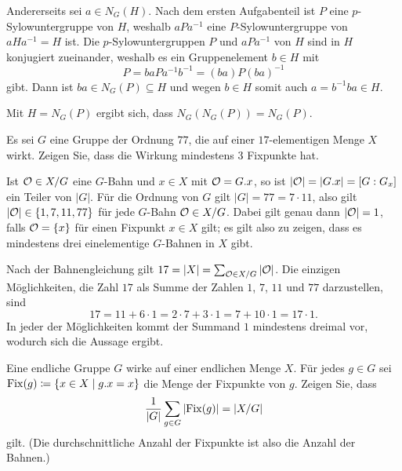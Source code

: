 \begin{solution}
\begin{enumerate}
      Andererseits sei $a \in N_G(H)$.
      Nach dem ersten Aufgabenteil ist $P$ eine $p$-Sylow\-un\-ter\-gruppe von $H$, weshalb $aPa^{-1}$ eine $P$-Sylow\-unter\-gruppe von $aHa^{-1} = H$ ist.
      Die $p$-Sylow\-unter\-gruppen $P$ und $aPa^{-1}$ von $H$ sind in $H$ konjugiert zueinander, weshalb es ein Gruppenelement $b \in H$ mit
      \[
          P
        = baPa^{-1}b^{-1}
        = (ba)P(ba)^{-1}
      \]
      gibt.
      Dann ist $ba \in N_G(P) \subseteq H$ und wegen $b \in H$ somit auch $a = b^{-1} ba \in H$.
      
      Mit $H = N_G(P)$ ergibt sich, dass $N_G(N_G(P)) = N_G(P)$.
  \end{enumerate}
\end{solution}


\begin{question}[subtitle = Bahnenkombinatorik]
  Es sei $G$ eine Gruppe der Ordnung $77$, die auf einer $17$-elementigen Menge $X$ wirkt.
  Zeigen Sie, dass die Wirkung mindestens $3$ Fixpunkte hat.
\end{question}


\begin{solution}
  Ist $\mathcal{O} \in X/G$ eine $G$-Bahn und $x \in X$ mit $\mathcal{O} = G.x$, so ist $|\mathcal{O}| = |G.x| = [G : G_x]$ ein Teiler von $|G|$.
  Für die Ordnung von $G$ gilt $|G| = 77 = 7 \cdot 11$, also gilt $|\mathcal{O}| \in \{1, 7, 11, 77\}$ für jede $G$-Bahn $\mathcal{O} \in X/G$.
  Dabei gilt genau dann $|\mathcal{O}| = 1$, falls $\mathcal{O} = \{x\}$ für einen Fixpunkt $x \in X$ gilt;
  es gilt also zu zeigen, dass es mindestens drei einelementige $G$-Bahnen in $X$ gibt.
  
  Nach der Bahnengleichung gilt $17 = |X| = \sum_{\mathcal{O} \in X/G} |\mathcal{O}|$.
  Die einzigen Möglichkeiten, die Zahl $17$ als Summe der Zahlen $1$, $7$, $11$ und $77$ darzustellen, sind
  \[
      17
    = 11 + 6 \cdot 1
    = 2 \cdot 7 + 3 \cdot 1
    = 7 + 10 \cdot 1
    = 17 \cdot 1.
  \]
  In jeder der Möglichkeiten kommt der Summand $1$ mindestens dreimal vor, wodurch sich die Aussage ergibt.
\end{solution}


\begin{question}[subtitle = Bahnen zählen]
  Eine endliche Gruppe $G$ wirke auf einer endlichen Menge $X$.
  Für jedes $g \in G$ sei $\operatorname{Fix}(g) \coloneqq \{x \in X \mid g.x = x\}$ die Menge der Fixpunkte von $g$.
  Zeigen Sie, dass
  \[
      \frac{1}{|G|} \sum_{g \in G} |{\operatorname{Fix}(g)}|
    = |X/G|
  \]
  gilt.
  (Die durchschnittliche Anzahl der Fixpunkte ist also die Anzahl der Bahnen.)
\end{question}


